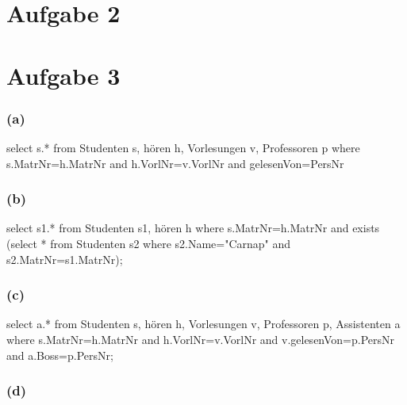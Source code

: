 \documentclass{article}
\begin{document}
\section*{Aufgabe 2}

\section*{Aufgabe 3}

\subsubsection*{(a)}

select s.* from Studenten s, hören h, Vorlesungen v, Professoren p where
s.MatrNr=h.MatrNr and h.VorlNr=v.VorlNr and gelesenVon=PersNr

\subsubsection*{(b)}

select s1.* from Studenten s1, hören h where s.MatrNr=h.MatrNr and exists (select * from Studenten s2 where s2.Name="Carnap" and s2.MatrNr=s1.MatrNr);

\subsubsection*{(c)}

select a.* from Studenten s, hören h, Vorlesungen v, Professoren p, Assistenten a where s.MatrNr=h.MatrNr and h.VorlNr=v.VorlNr and v.gelesenVon=p.PersNr and a.Boss=p.PersNr;

\subsubsection*{(d)}
\end{document}
